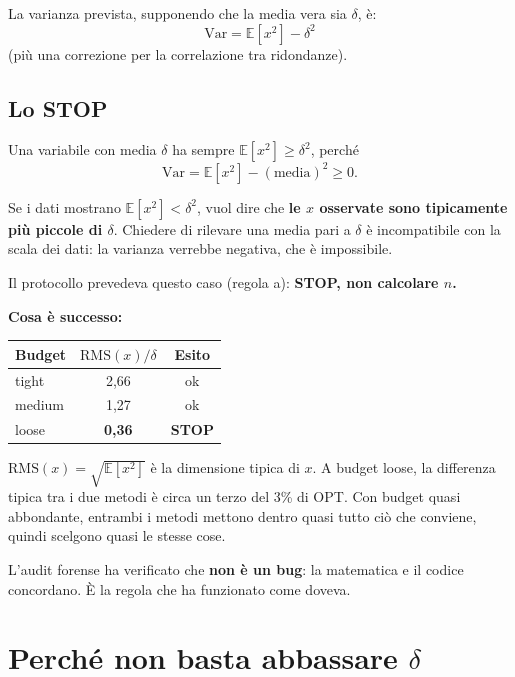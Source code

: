 \documentclass[11pt,a4paper]{article}
\begin{document}
La varianza prevista, supponendo che la media vera sia $\delta$, è:
\[
\mathrm{Var} = \mathbb{E}[x^2] - \delta^2
\]
(più una correzione per la correlazione tra ridondanze).

\subsection{Lo STOP}

Una variabile con media $\delta$ ha sempre $\mathbb{E}[x^2] \ge \delta^2$, perché
\[
\mathrm{Var} = \mathbb{E}[x^2] - (\text{media})^2 \ge 0.
\]

Se i dati mostrano $\mathbb{E}[x^2] < \delta^2$, vuol dire che \textbf{le $x$ osservate sono tipicamente più piccole di $\delta$}. Chiedere di rilevare una media pari a $\delta$ è incompatibile con la scala dei dati: la varianza verrebbe negativa, che è impossibile.

Il protocollo prevedeva questo caso (regola a): \textbf{STOP, non calcolare $n$.}

\textbf{Cosa è successo:}

\begin{center}
\begin{tabular}{lcc}
\toprule
\textbf{Budget} & $\mathrm{RMS}(x)/\delta$ & \textbf{Esito} \\
\midrule
tight  & 2,66 & ok \\
medium & 1,27 & ok \\
loose  & \textbf{0,36} & \textbf{STOP} \\
\bottomrule
\end{tabular}
\end{center}

$\mathrm{RMS}(x) = \sqrt{\mathbb{E}[x^2]}$ è la dimensione tipica di $x$. A budget loose, la differenza tipica tra i due metodi è circa un terzo del 3\% di OPT. Con budget quasi abbondante, entrambi i metodi mettono dentro quasi tutto ciò che conviene, quindi scelgono quasi le stesse cose.

\begin{nota}
L'audit forense ha verificato che \textbf{non è un bug}: la matematica e il codice concordano. È la regola che ha funzionato come doveva.
\end{nota}

\section{Perché non basta abbassare $\delta$}
\end{document}
